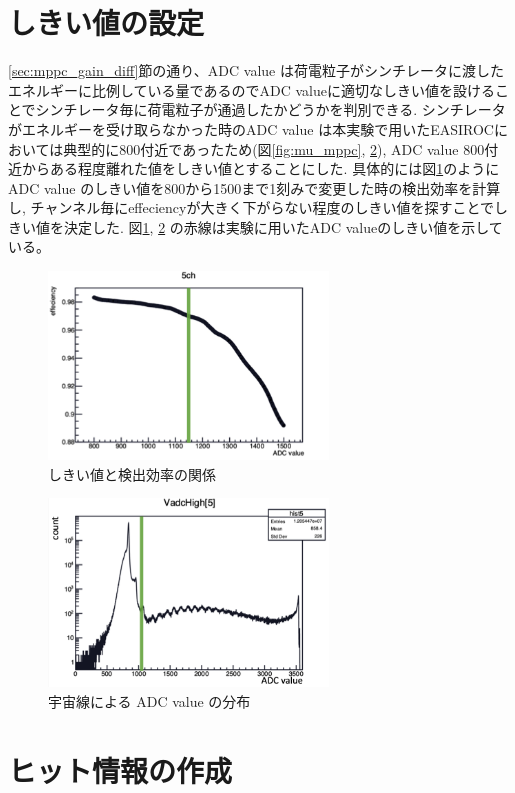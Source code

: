 \section{しきい値の設定}\label{sec:anal:threshold}
\ref{sec:mppc_gain_diff}節の通り、ADC value は荷電粒子がシンチレータに渡したエネルギーに比例している量であるのでADC valueに適切なしきい値を設けることでシンチレータ毎に荷電粒子が通過したかどうかを判別できる.
シンチレータがエネルギーを受け取らなかった時のADC value は本実験で用いたEASIROCにおいては典型的に800付近であったため(図\ref{fig:mu_mppc}, \ref{fig:threhist}), ADC value 800付近からある程度離れた値をしきい値とすることにした.
具体的には図\ref{fig:adc_eff}のようにADC value のしきい値を800から1500まで1刻みで変更した時の検出効率を計算し, チャンネル毎にeffeciencyが大きく下がらない程度のしきい値を探すことでしきい値を決定した.
図\ref{fig:adc_eff}, \ref{fig:threhist} の赤線は実験に用いたADC valueのしきい値を示している。
\begin{figure}[H]
    \centering
    \includegraphics[height=5.0cm]{img/adc_eff.png}
    \caption{しきい値と検出効率の関係}
    \label{fig:adc_eff}
\end{figure}
\begin{figure}[H]
    \centering
    \includegraphics[height=5.0cm]{img/pedestal.png}
    \caption{宇宙線による ADC value の分布}
    \label{fig:threhist}
\end{figure}

\section{ヒット情報の作成}
